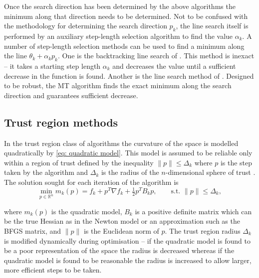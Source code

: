 Once the search direction has been determined by the above algorithms the minimum along that direction needs to be determined.  Not to be confused with the methodology for determining the search direction $p_k$, the line search itself is performed by an auxiliary step-length selection algorithm to find the value $\alpha_k$.  A number of step-length selection methods can be used to find a minimum along the line $\theta_k + \alpha_k p_k$.  One is the backtracking line search of \citet{NocedalWright99}.  This method is inexact -- it takes a starting step length $\alpha_k$ and decreases the value until a sufficient decrease in the function is found.  Another is the line search method of \citet{MoreThuente94}.  Designed to be robust, the MT algorithm finds the exact minimum along the search direction and guarantees sufficient decrease.




\subsection{Trust region methods}

In the trust region class of algorithms the curvature of the space is modelled quadratically by \eqref{eq: quadratic model}.  This model is assumed to be reliable only within a region of trust defined by the inequality $\lVert p \rVert \leqslant \Delta_k$ where $p$ is the step taken by the algorithm and $\Delta_k$ is the radius of the $n$-dimensional sphere of trust \citep{NocedalWright99}.  The solution sought for each iteration of the algorithm is
\begin{equation} \label{eq: trust region}
 \min_{p \in \mathbb{R}^n} m_k(p) = f_k  +  p^{T} \nabla f_k  +  \tfrac{1}{2} p^{T} B_k p,  \qquad \textrm{s.t. } \lVert p \rVert \leqslant \Delta_k,
\end{equation}

\noindent where $m_k(p)$ is the quadratic model, $B_k$ is a positive definite matrix which can be the true Hessian as in the Newton model or an approximation such as the BFGS matrix, and $\lVert p \rVert$ is the Euclidean norm of $p$.  The trust region radius $\Delta_k$ is modified dynamically during optimisation -- if the quadratic model is found to be a poor representation of the space the radius is decreased whereas if the quadratic model is found to be reasonable the radius is increased to allow larger, more efficient steps to be taken.


